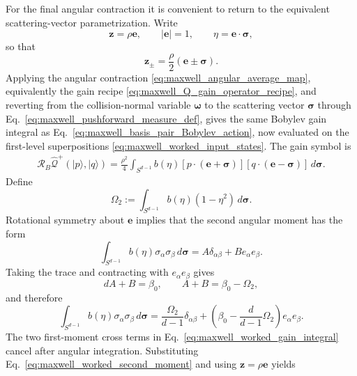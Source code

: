 \documentclass[11pt,oneside]{article}
\numberwithin{equation}{section}
\theoremstyle{definition}
\begin{document}
For the final angular contraction it is convenient to return to the equivalent scattering-vector parametrization.  Write
\begin{equation}
\bm z=\rho\bm e,
\qquad
|\bm e|=1,
\qquad
\eta=\bm e\cdot\bm\sigma ,
\end{equation}
so that
\begin{equation}
\bm z_\pm=\frac{\rho}{2}(\bm e\pm\bm\sigma).
\end{equation}
Applying the angular contraction
\eqref{eq:maxwell_angular_average_map}, equivalently the gain recipe
\eqref{eq:maxwell_Q_gain_operator_recipe}, and reverting from the
collision-normal variable $\bm\omega$ to the scattering vector $\bm\sigma$
through Eq.~\eqref{eq:maxwell_pushforward_measure_def}, gives the same
Bobylev gain integral as Eq.~\eqref{eq:maxwell_basis_pair_Bobylev_action},
now evaluated on the first-level superpositions \eqref{eq:maxwell_worked_input_states}.
The gain symbol is
\begin{equation}
\begin{aligned}
\mathcal R_B\widehat{\mathcal Q}^{+}(|p\rangle,|q\rangle)
=
\frac{\rho^2}{4}
\int_{S^{d-1}}b(\eta)
[p\cdot(\bm e+\bm\sigma)]
[q\cdot(\bm e-\bm\sigma)]
\,d\bm\sigma .
\end{aligned}
\label{eq:maxwell_worked_gain_integral}
\end{equation}
Define
\begin{equation}
\Omega_2
:=
\int_{S^{d-1}}b(\eta)(1-\eta^2)\,d\bm\sigma .
\label{eq:maxwell_Omega2}
\end{equation}
Rotational symmetry about $\bm e$ implies that the second angular moment has the form
\begin{equation}
\int_{S^{d-1}}
b(\eta)\sigma_\alpha\sigma_\beta\,d\bm\sigma
=
A\delta_{\alpha\beta}+B e_\alpha e_\beta .
\end{equation}
Taking the trace and contracting with $e_\alpha e_\beta$ gives
\begin{equation}
dA+B=\beta_0,
\qquad
A+B=\beta_0-\Omega_2,
\end{equation}
and therefore
\begin{equation}
\int_{S^{d-1}}
b(\eta)\sigma_\alpha\sigma_\beta\,d\bm\sigma
=
\frac{\Omega_2}{d-1}\delta_{\alpha\beta}
+
\left(
\beta_0-\frac{d}{d-1}\Omega_2
\right)e_\alpha e_\beta .
\label{eq:maxwell_worked_second_moment}
\end{equation}
The two first-moment cross terms in Eq.~\eqref{eq:maxwell_worked_gain_integral} cancel after angular integration.  Substituting Eq.~\eqref{eq:maxwell_worked_second_moment} and using $\bm z=\rho\bm e$ yields
\end{document}
